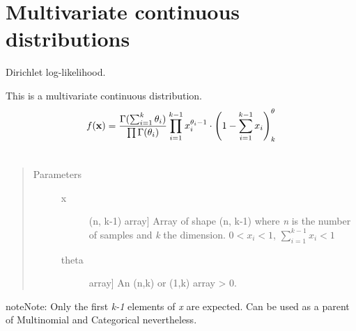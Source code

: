\documentclass[letterpaper,10pt,english]{sphinxmanual}
\begin{document}
\section{Multivariate continuous distributions}
\label{distributions:multivariate-continuous-distributions}

\begin{fulllineitems}
\label{distributions:pymc.distributions.dirichlet_like}
Dirichlet log-likelihood.

This is a multivariate continuous distribution.
\begin{gather}
\begin{split}f(\mathbf{x}) = \frac{\Gamma(\sum_{i=1}^k \theta_i)}{\prod \Gamma(\theta_i)}\prod_{i=1}^{k-1} x_i^{\theta_i - 1}
\cdot\left(1-\sum_{i=1}^{k-1}x_i\right)^\theta_k\end{split}\notag\\\begin{split}\end{split}\notag
\end{gather}\begin{quote}\begin{description}
\item[{Parameters }] \leavevmode\begin{description}
\item[{x}] \leavevmode{[}(n, k-1) array{]}
Array of shape (n, k-1) where \emph{n} is the number of samples
and \emph{k} the dimension.
$0 < x_i < 1$,  $\sum_{i=1}^{k-1} x_i < 1$

\item[{theta}] \leavevmode{[}array{]}
An (n,k) or (1,k) array \textgreater{} 0.

\end{description}

\end{description}\end{quote}

\begin{notice}{note}{Note:}
Only the first \emph{k-1} elements of \emph{x} are expected. Can be used
as a parent of Multinomial and Categorical nevertheless.
\end{notice}

\end{fulllineitems}

\end{document}
